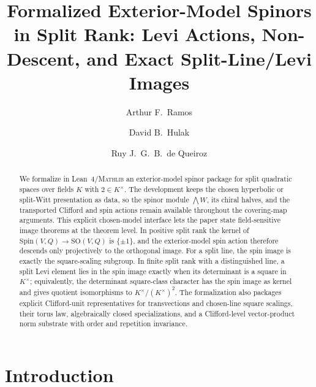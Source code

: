 \documentclass{birkjour}
\title[Formalized exterior-model spinors in split rank]
  {Formalized Exterior-Model Spinors in Split Rank: Levi Actions,
   Non-Descent, and Exact Split-Line/Levi Images}
\theoremstyle{plain}
\theoremstyle{definition}
\theoremstyle{remark}
\newcommand{\Spin}{\mathrm{Spin}}
\newcommand{\SO}{\mathrm{SO}}
\newcommand{\Lean}{Lean~4\xspace}
\newcommand{\Mathlib}{\textsc{Mathlib}\xspace}
\begin{document}
\author[A.~F.~Ramos]{Arthur F.~Ramos}
\address{Microsoft, USA}

\author[D.~B.~Hulak]{David B.~Hulak}
\address{Independent Researcher, Brazil}

\author[R.~J.~G.~B.~de Queiroz]{Ruy J.~G.~B.~de Queiroz}
\address{Centro de Inform\'atica, Universidade Federal de Pernambuco, Brazil}



\begin{abstract}
We formalize in \Lean/\Mathlib an exterior-model spinor package for split
quadratic spaces over fields $K$ with $2\in K^\times$. The development keeps the
chosen hyperbolic or split-Witt presentation as data, so the spinor module
$\bigwedge W$, its chiral halves, and the transported Clifford and spin actions
remain available throughout the covering-map arguments. This explicit
chosen-model interface lets the paper state field-sensitive image theorems at
the theorem level. In positive split rank the kernel of
$\Spin(V,Q)\to\SO(V,Q)$ is $\{\pm1\}$, and the exterior-model spin action
therefore descends only projectively to the orthogonal image. For a split line,
the spin image is exactly the square-scaling subgroup. In finite split rank with
a distinguished line, a split Levi element lies in the spin image exactly when
its determinant is a square in $K^\times$; equivalently, the determinant
square-class character has the spin image as kernel and gives quotient
isomorphisms to $K^\times/(K^\times)^2$. The formalization also packages
explicit Clifford-unit representatives for transvections and chosen-line square
scalings, their torus law, algebraically closed specializations, and a
Clifford-level vector-product norm substrate with order and repetition
invariance.
\end{abstract}

\maketitle

\section{Introduction}
\label{sec:intro}
\end{document}
